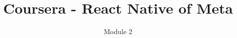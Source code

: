 \documentclass[english]{reportDoCS2025}
\title{Coursera - React Native of Meta}
\subtitle{Module 2}
\begin{document}
\cover

\contents
\listImages
% 




% 
% 
% 
% 
% 
% 

\end{document}
